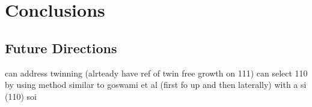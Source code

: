 \chapter{Conclusions}
\label{chap:conclusions}
\section{Future Directions}
can address twinning (alrteady have ref of twin free growth on 111)
can select 110 by using method similar to goswami et al (first fo up and then laterally) with a si (110) soi